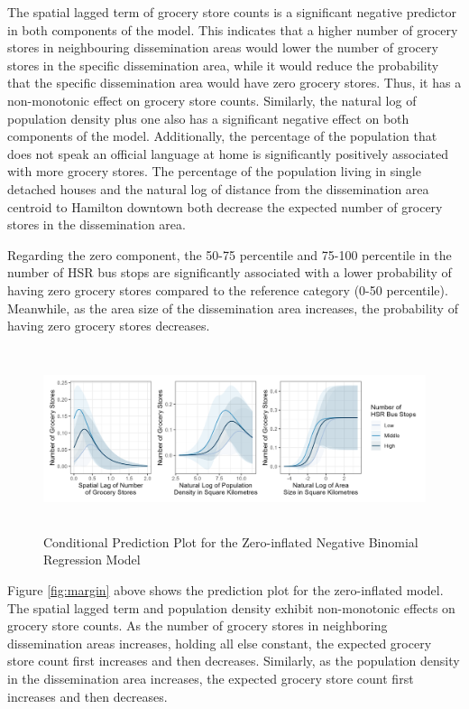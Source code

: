 \documentclass[preprint, 3p,
authoryear]{elsarticle} %
\begin{document}
The spatial lagged term of grocery store counts is a significant
negative predictor in both components of the model. This indicates that
a higher number of grocery stores in neighbouring dissemination areas
would lower the number of grocery stores in the specific dissemination
area, while it would reduce the probability that the specific
dissemination area would have zero grocery stores. Thus, it has a
non-monotonic effect on grocery store counts. Similarly, the natural log
of population density plus one also has a significant negative effect on
both components of the model. Additionally, the percentage of the
population that does not speak an official language at home is
significantly positively associated with more grocery stores. The
percentage of the population living in single detached houses and the
natural log of distance from the dissemination area centroid to Hamilton
downtown both decrease the expected number of grocery stores in the
dissemination area.

Regarding the zero component, the 50-75 percentile and 75-100 percentile
in the number of HSR bus stops are significantly associated with a lower
probability of having zero grocery stores compared to the reference
category (0-50 percentile). Meanwhile, as the area size of the
dissemination area increases, the probability of having zero grocery
stores decreases.

\begin{figure}

{\centering \includegraphics[width=6.3in,height=2.1in]{./images/margin} 

}

\caption{\label{fig:margin}Conditional Prediction Plot for the Zero-inflated Negative Binomial Regression Model}\label{fig:unnamed-chunk-18}
\end{figure}

Figure \ref{fig:margin} above shows the prediction plot for the
zero-inflated model. The spatial lagged term and population density
exhibit non-monotonic effects on grocery store counts. As the number of
grocery stores in neighboring dissemination areas increases, holding all
else constant, the expected grocery store count first increases and then
decreases. Similarly, as the population density in the dissemination
area increases, the expected grocery store count first increases and
then decreases.
\end{document}
